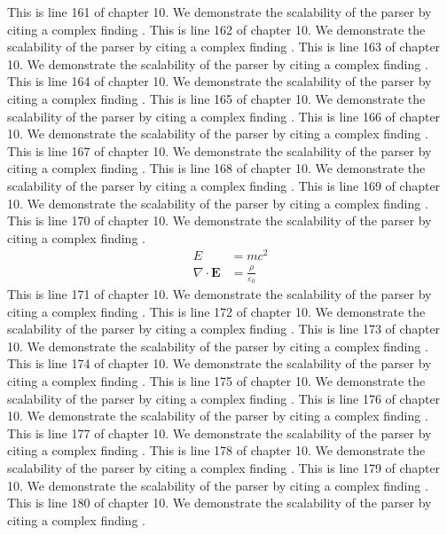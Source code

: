 This is line 161 of chapter 10. We demonstrate the scalability of the parser by citing a complex finding \cite{ref10_161}.
This is line 162 of chapter 10. We demonstrate the scalability of the parser by citing a complex finding \cite{ref10_162}.
This is line 163 of chapter 10. We demonstrate the scalability of the parser by citing a complex finding \cite{ref10_163}.
This is line 164 of chapter 10. We demonstrate the scalability of the parser by citing a complex finding \cite{ref10_164}.
This is line 165 of chapter 10. We demonstrate the scalability of the parser by citing a complex finding \cite{ref10_165}.
This is line 166 of chapter 10. We demonstrate the scalability of the parser by citing a complex finding \cite{ref10_166}.
This is line 167 of chapter 10. We demonstrate the scalability of the parser by citing a complex finding \cite{ref10_167}.
This is line 168 of chapter 10. We demonstrate the scalability of the parser by citing a complex finding \cite{ref10_168}.
This is line 169 of chapter 10. We demonstrate the scalability of the parser by citing a complex finding \cite{ref10_169}.
This is line 170 of chapter 10. We demonstrate the scalability of the parser by citing a complex finding \cite{ref10_170}.
\begin{align*}
  E &= mc^2 \\
  \nabla \cdot \mathbf{E} &= \frac{\rho}{\varepsilon_0}
\end{align*}
This is line 171 of chapter 10. We demonstrate the scalability of the parser by citing a complex finding \cite{ref10_171}.
This is line 172 of chapter 10. We demonstrate the scalability of the parser by citing a complex finding \cite{ref10_172}.
This is line 173 of chapter 10. We demonstrate the scalability of the parser by citing a complex finding \cite{ref10_173}.
This is line 174 of chapter 10. We demonstrate the scalability of the parser by citing a complex finding \cite{ref10_174}.
This is line 175 of chapter 10. We demonstrate the scalability of the parser by citing a complex finding \cite{ref10_175}.
This is line 176 of chapter 10. We demonstrate the scalability of the parser by citing a complex finding \cite{ref10_176}.
This is line 177 of chapter 10. We demonstrate the scalability of the parser by citing a complex finding \cite{ref10_177}.
This is line 178 of chapter 10. We demonstrate the scalability of the parser by citing a complex finding \cite{ref10_178}.
This is line 179 of chapter 10. We demonstrate the scalability of the parser by citing a complex finding \cite{ref10_179}.
This is line 180 of chapter 10. We demonstrate the scalability of the parser by citing a complex finding \cite{ref10_180}.
